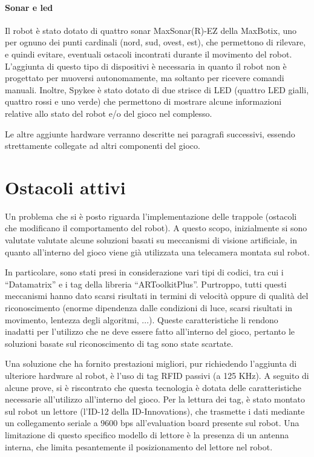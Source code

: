 \paragraph{Sonar e led} Il robot è stato dotato di quattro sonar MaxSonar(R)-EZ della MaxBotix, uno per ognuno dei punti cardinali (nord, sud, ovest, est), che permettono di rilevare, e quindi evitare, eventuali ostacoli incontrati durante il movimento del robot. L'aggiunta di questo tipo di dispositivi è necessaria in quanto il robot non è progettato per muoversi autonomamente, ma soltanto per ricevere comandi manuali. Inoltre, Spykee è stato dotato di due strisce di LED (quattro LED gialli, quattro rossi e uno verde) che permettono di mostrare alcune informazioni relative allo stato del robot e/o del gioco nel complesso.

\begin{nota}
Le altre aggiunte hardware verranno descritte nei paragrafi successivi, essendo strettamente collegate ad altri componenti del gioco.
\end{nota}


\section{Ostacoli attivi}
Un problema che si è posto riguarda l'implementazione delle trappole (ostacoli che modificano il comportamento del robot). A questo scopo, inizialmente si sono valutate valutate alcune soluzioni basati su meccanismi di visione artificiale, in quanto all'interno del gioco viene già utilizzata una telecamera montata sul robot.

In particolare, sono stati presi in considerazione vari tipi di codici, tra cui i ``Datamatrix'' e i tag della libreria ``ARToolkitPlus''. Purtroppo, tutti questi meccanismi hanno dato scarsi risultati in termini di velocità oppure di qualità del riconoscimento (enorme dipendenza dalle condizioni di luce, scarsi risultati in movimento, lentezza degli algoritmi, ...). Queste caratteristiche li rendono inadatti per l'utilizzo che ne deve essere fatto all'interno del gioco, pertanto le soluzioni basate sul riconoscimento di tag sono state scartate.

Una soluzione che ha fornito prestazioni migliori, pur richiedendo l'aggiunta di ulteriore hardware al robot, è l'uso di tag RFID passivi (a 125 KHz). A seguito di alcune prove, si è riscontrato che questa tecnologia è dotata delle caratteristiche necessarie all'utilizzo all'interno del gioco. Per la lettura dei tag, è stato montato sul robot un lettore (l'ID-12 della ID-Innovations), che trasmette i dati mediante un collegamento seriale a 9600 bps all'evaluation board presente sul robot. Una limitazione di questo specifico modello di lettore è la presenza di un antenna interna, che limita pesantemente il posizionamento del lettore nel robot.

